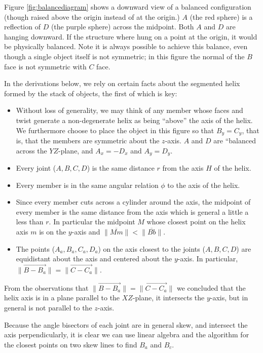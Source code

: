 \documentclass[11pt]{article}
\begin{document}
{Figure \ref{fig:balancediagram} shows a downward view of a balanced configuration (though raised above the origin
instead of at the origin.) $A$ (the red sphere) is a reflection of $D$ (the purple sphere) across
the midpoint. Both $A$ and $D$ are hanging downward. If the structure where hung on a point at the origin, it would
be physically balanced. Note it is always possible to achieve this balance, even though a single object
itself is not symmetric; in this figure the normal of the $B$ face is not symmetric with $C$ face.


In the derivations below, we rely on certain facts about
the segmented helix formed by the stack of objects, the first
of which is key:
\begin{itemize}
\item Without loss of generality, we may think of any member whose faces
  and twist generate a non-degenerate helix as being ``above'' the
  axis of the helix. We furthermore choose to place the object in
  this figure so that $B_y = C_y$, that is, that the members are symmetric
  about the $z$-axis.
  $A$ and $D$ are ``balanced across the $YZ$-plane,
  and $A_x = -D_x$ and $A_y = D_y$.
\item Every joint ($A,B,C,D$) is the same distance $r$ from the axis $H$ of the helix.
\item Every member is in the same angular relation $\phi$ to the axis of the helix.
\item Since every member cuts across a cylinder around the axis,
  the midpoint of every member is the same distance from the axis
  which is general a little a less than $r$. In particular the midpoint $M$
  whose closest point on the helix axis $m$ is on the $y$-axis and
  $\| \overline{Mm} \| < \| \overline{Bb} \|$.
\item The points ($A_a,B_a,C_a,D_a$) on the axis closest to the joints ($A,B,C,D$)
  are equidistant about the axis and centered about the $y$-axis. In
  particular, $\| \overrightarrow{B - B_a} \| = \| \overrightarrow{C - C_a} \|$.
\end{itemize}

From the observations that $\| \overrightarrow{B - B_a} \| = \| \overrightarrow{C - C_a} \|$
we concluded that the helix axis is in a plane
parallel to the $XZ$-plane, it intersects the $y$-axis, but in general is
not parallel to the $z$-axis.

Because the angle bisectors of each joint are in general skew, and intersect the
axis perpendicularly, it is clear we can use linear algebra and the algorithm
for the closest points on two skew lines to find $B_a$ and $B_c$.

}
\end{document}
